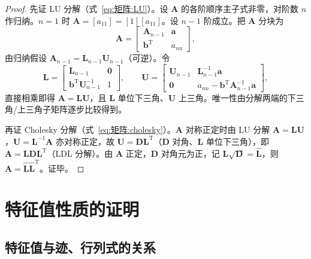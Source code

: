 \begin{proof}
先证 LU 分解（式~\eqref{eq:矩阵:LU}）。设 $\boldsymbol{A}$ 的各阶顺序主子式非零，对阶数 $n$ 作归纳。$n=1$ 时 $\boldsymbol{A} = [a_{11}] = [1][a_{11}]$。设 $n-1$ 阶成立。把 $\boldsymbol{A}$ 分块为
\[
\boldsymbol{A} = \begin{bmatrix} \boldsymbol{A}_{n-1} & \boldsymbol{a} \\ \boldsymbol{b}^{\mathrm{T}} & a_{nn} \end{bmatrix},
\]
由归纳假设 $\boldsymbol{A}_{n-1} = \boldsymbol{L}_{n-1}\boldsymbol{U}_{n-1}$（可逆）。令
\[
\boldsymbol{L} = \begin{bmatrix} \boldsymbol{L}_{n-1} & \boldsymbol{0} \\ \boldsymbol{b}^{\mathrm{T}}\boldsymbol{U}_{n-1}^{-1} & 1 \end{bmatrix}, \qquad
\boldsymbol{U} = \begin{bmatrix} \boldsymbol{U}_{n-1} & \boldsymbol{L}_{n-1}^{-1}\boldsymbol{a} \\ \boldsymbol{0} & a_{nn}-\boldsymbol{b}^{\mathrm{T}}\boldsymbol{A}_{n-1}^{-1}\boldsymbol{a} \end{bmatrix},
\]
直接相乘即得 $\boldsymbol{A} = \boldsymbol{L}\boldsymbol{U}$，且 $\boldsymbol{L}$ 单位下三角、$\boldsymbol{U}$ 上三角。唯一性由分解两端的下三角/上三角子矩阵逐步比较得到。

再证 Cholesky 分解（式~\eqref{eq:矩阵:cholesky}）。$\boldsymbol{A}$ 对称正定时由 LU 分解 $\boldsymbol{A} = \boldsymbol{L}\boldsymbol{U}$，$\boldsymbol{U} = \boldsymbol{L}^{-1}\boldsymbol{A}$ 亦对称正定，故 $\boldsymbol{U} = \boldsymbol{D}\boldsymbol{L}^{\mathrm{T}}$（$\boldsymbol{D}$ 对角、$\boldsymbol{L}$ 单位下三角），即 $\boldsymbol{A} = \boldsymbol{L}\boldsymbol{D}\boldsymbol{L}^{\mathrm{T}}$（LDL 分解）。由 $\boldsymbol{A}$ 正定，$\boldsymbol{D}$ 对角元为正，记 $\boldsymbol{L}\sqrt{\boldsymbol{D}} = \hat{\boldsymbol{L}}$，则 $\boldsymbol{A} = \hat{\boldsymbol{L}}\hat{\boldsymbol{L}}^{\mathrm{T}}$。证毕。
\end{proof}

\section{特征值性质的证明}
\label{sec:特征值证明}

\subsection*{特征值与迹、行列式的关系}

